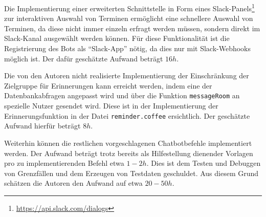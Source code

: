 Die Implementierung einer erweiterten Schnittstelle in Form eines Slack-Panels\footnote{\url{https://api.slack.com/dialogs}} zur interaktiven Auswahl von Terminen ermöglicht eine schnellere Auswahl von Terminen, da diese nicht immer einzeln erfragt werden müssen, sondern direkt im Slack-Kanal ausgewählt werden können.
Für diese Funktionalität ist die Registrierung des Bots als \enquote{Slack-App} nötig, da dies nur mit Slack-Webhooks möglich ist.
Der dafür geschätzte Aufwand beträgt $16h$.

Die von den Autoren nicht realisierte Implementierung der Einschränkung der Zielgruppe für Erinnerungen kann erreicht werden, indem eine der Datenbankabfragen angepasst wird und über die Funktion \texttt{messageRoom} an spezielle Nutzer gesendet wird. Diese ist in der Implementierung der Erinnerungsfunktion in der Datei \texttt{reminder.coffee} ersichtlich. Der geschätzte Aufwand hierfür beträgt $8h$.

Weiterhin können die restlichen vorgeschlagenen Chatbotbefehle implementiert werden. Der Aufwand beträgt trotz bereits als Hilfestellung dienender Vorlagen pro zu implementierenden Befehl etwa $1-2h$. Dies ist dem Testen und Debuggen von Grenzfällen und dem Erzeugen von Testdaten geschuldet. Aus diesem Grund schätzen die Autoren den Aufwand auf etwa $20-50h$.
